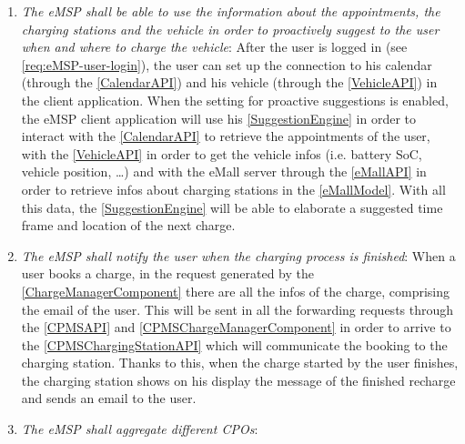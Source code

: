 \begin{enumerate}[label=\textbf{R\arabic*}]
          \label{req:eMSP-connect-calendar}
    \item \textit{The \ac{eMSP} shall be able to use the information about the appointments, the charging stations and the vehicle in order to proactively suggest to the user when and where to charge the vehicle}:
          After the user is logged in (see \ref{req:eMSP-user-login}), the user can set up the connection to his calendar (through the \ref{CalendarAPI}) and his vehicle (through the \ref{VehicleAPI}) in the client application.
          When the setting for proactive suggestions is enabled, the \ac{eMSP} client application will use his \ref{SuggestionEngine} in order to interact with the \ref{CalendarAPI} to retrieve the appointments of the user, with the \ref{VehicleAPI} in order to get the vehicle infos (i.e. battery \ac{SoC}, vehicle position, \ldots) and with the \ac{eMall} server through the \ref{eMallAPI} in order to retrieve infos about charging stations in the \ref{eMallModel}.
          With all this data, the \ref{SuggestionEngine} will be able to elaborate a suggested time frame and location of the next charge.
          \label{req:eMSP-proactive-suggestions}
    \item \textit{The \ac{eMSP} shall notify the user when the charging process is finished}:
          When a user books a charge, in the request generated by the \ref{ChargeManagerComponent} there are all the infos of the charge, comprising the email of the user. This will be sent in all the forwarding requests through the \ref{CPMSAPI} and \ref{CPMSChargeManagerComponent} in order to arrive to the \ref{CPMSChargingStationAPI} which will communicate the booking to the charging station.
          Thanks to this, when the charge started by the user finishes, the charging station shows on his display the message of the finished recharge and sends an email to the user.
          \label{req:eMSP-notification}
    \item \textit{The \ac{eMSP} shall aggregate different \acp{CPO}}:

\end{enumerate}
